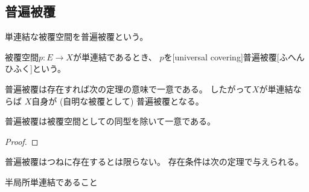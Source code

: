 \documentclass[report]{jlreq}
\begin{document}
%
%
%
%

\subsection{普遍被覆}

単連結な被覆空間を普遍被覆という。

\begin{definition}[普遍被覆]
    被覆空間$p \colon E \to X$が単連結であるとき、
    $p$を[universal covering]{普遍被覆}[ふへんひふく]という。
\end{definition}

普遍被覆は存在すれば次の定理の意味で一意である。
したがって$X$が単連結ならば
$X$自身が (自明な被覆として) 普遍被覆となる。

\begin{theorem}[普遍被覆の一意性]
    普遍被覆は被覆空間としての同型を除いて一意である。
    \TODO{}
\end{theorem}

\begin{proof}
    \TODO{}
\end{proof}

普遍被覆はつねに存在するとは限らない。
存在条件は次の定理で与えられる。

\begin{theorem}[普遍被覆の存在定理]
    半局所単連結であること
    \TODO{}
\end{theorem}
\end{document}
